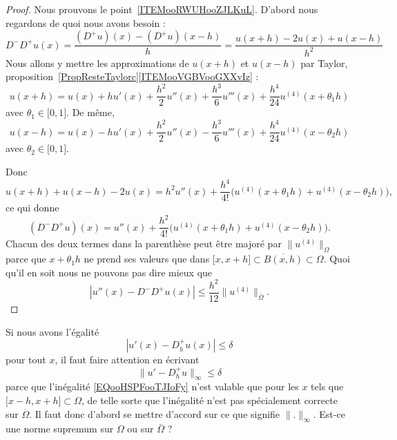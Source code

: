 \begin{proof}
	Nous prouvons le point~\ref{ITEMooRWUHooZJLKuL}. D'abord nous regardons de quoi nous avons besoin :
	\begin{equation}        \label{EQooBLIIooWHXbqD}
		D^-D^+u(x)=\frac{ (D^+u)(x)-(D^+u)(x-h) }{ h }=\frac{ u(x+h)-2u(x)+u(x-h) }{ h^2 }
	\end{equation}
	Nous allons y mettre les approximations de \( u(x+h)\) et \( u(x-h)\) par Taylor, proposition~\ref{PropResteTaylorc}\ref{ITEMooVGBVooGXXvIz} :
	\begin{equation}
		u(x+h)=u(x)+hu'(x)+\frac{ h^2 }{2}u''(x)+\frac{ h^3 }{ 6 }u'''(x)+\frac{ h^4 }{ 24 }u^{(4)}(x+\theta_1h)
	\end{equation}
	avec \( \theta_1\in \mathopen[ 0 , 1 \mathclose]\). De même,
	\begin{equation}
		u(x-h)=u(x)-hu'(x)+\frac{ h^2 }{2}u''(x)-\frac{ h^3 }{ 6 }u'''(x)+\frac{ h^4 }{ 24 }u^{(4)}(x-\theta_2h)
	\end{equation}
	avec \( \theta_2\in \mathopen[ 0 , 1 \mathclose]\).

	Donc
	\begin{equation}
		u(x+h)+u(x-h)-2u(x)=h^2u''(x)+\frac{ h^4 }{ 4! }\Big( u^{(4)}(x+\theta_1h)+u^{(4)}(x-\theta_2h) \Big),
	\end{equation}
	ce qui donne
	\begin{equation}
		(D^-D^+u)(x)=u''(x)+\frac{ h^2 }{ 4! }\Big( u^{(4)}(x+\theta_1h)+u^{(4)}(x-\theta_2h) \Big).
	\end{equation}
	Chacun des deux termes dans la parenthèse peut être majoré par \( \| u^{(4)} \|_{\Omega}\) parce que \( x+\theta_1h\) ne prend ses valeurs que dans \( \mathopen[ x , x+h \mathclose]\subset\overline{ B(x,h) }\subset\Omega\). Quoi qu'il en soit nous ne pouvons pas dire mieux que
	\begin{equation}
		| u''(x)-D^-D^+u(x) |\leq \frac{ h^2 }{ 12 }\| u^{(4)} \|_{\overline{ \Omega }}.
	\end{equation}
\end{proof}

\begin{remark}
	Si nous avons l'égalité
	\begin{equation}        \label{EQooHSPFooTJIoFy}
		| u'(x)-D_h^+u(x) |\leq \delta
	\end{equation}
	pour tout \( x\), il faut faire attention en écrivant
	\begin{equation}
		\| u'-D_h^+u \|_{\infty}\leq \delta
	\end{equation}
	parce que l'inégalité \eqref{EQooHSPFooTJIoFy} n'est valable que pour les \( x\) tels que \( \mathopen[ x-h , x+h \mathclose]\subset \Omega\), de telle sorte que l'inégalité n'est pas spécialement correcte sur \( \overline{ \Omega }\). Il faut donc d'abord se mettre d'accord sur ce que signifie \( \| . \|_{\infty}\). Est-ce une norme supremum sur \( \Omega\) ou sur \( \bar \Omega\) ?
\end{remark}

